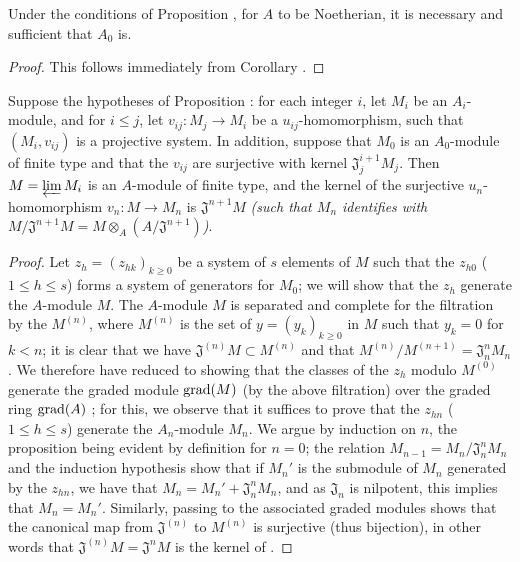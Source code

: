 \begin{corollary}[7.2.8]
\label{0.7.2.8}
Under the conditions of Proposition , for $A$ to
be Noetherian, it is necessary and sufficient that $A_0$ is.
\end{corollary}

\begin{proof}
This follows immediately from Corollary .
\end{proof}

\begin{proposition}[7.2.9]
\label{0.7.2.9}
Suppose the hypotheses of Proposition : for each integer $i$,
let $M_i$ be an $A_i$-module, and for $i\leq j$, let $v_{ij}:M_j\to M_i$ be a
$u_{ij}$-homomorphism, such that $(M_i,v_{ij})$ is a projective system. In addition, suppose
that $M_0$ is an $A_0$-module of finite type and that the $v_{ij}$ are surjective with kernel
$\mathfrak{J}_j^{i+1}M_j$. Then $M=\varprojlim M_i$ is an $A$-module of finite type, and the
kernel of the surjective $u_n$-homomorphism $v_n:M\to M_n$ is $\mathfrak{J}^{n+1}M$
\emph{(such that $M_n$ identifies with
$M/\mathfrak{J}^{n+1}M=M\otimes_A(A/\mathfrak{J}^{n+1})$)}.
\end{proposition}

\begin{proof}
Let $z_h=(z_{hk})_{k\geq 0}$ be a system of $s$ elements of $M$ such that the $z_{h0}$
($1\leq h\leq s$) forms a system of generators for $M_0$; we will show that the
$z_h$ generate the $A$-module $M$. The $A$-module $M$ is separated and complete for the
filtration by the $M^{(n)}$, where $M^{(n)}$ is the set of $y=(y_k)_{k\geq 0}$ in $M$
such that $y_k=0$ for $k<n$; it is clear that we have $\mathfrak{J}^{(n)}M\subset M^{(n)}$
and that $M^{(n)}/M^{(n+1)}=\mathfrak{J}_n^n M_n$. We therefore have reduced to showing that
the classes of the $z_h$ modulo $M^{(0)}$ generate the graded module ${\mathop{\mathrm{grad}}\nolimits}(M)$ (by the
above filtration) over the graded ring ${\mathop{\mathrm{grad}}\nolimits}(A)$ \cite[p.~18--06, lemme]{I-1}; for this, we
observe that it suffices to prove that the $z_{hn}$ ($1\leq h\leq s$) generate the
$A_n$-module $M_n$. We argue by induction on $n$, the proposition being evident by definition
for $n=0$; the relation $M_{n-1}=M_n/\mathfrak{J}_n^n M_n$ and the induction hypothesis show
that if $M_n'$ is the submodule of $M_n$ generated by the $z_{hn}$, we have that
$M_n=M_n'+\mathfrak{J}_n^n M_n$, and as $\mathfrak{J}_n$ is nilpotent, this implies that
$M_n=M_n'$. Similarly, passing to the associated graded modules shows that the canonical map
from $\mathfrak{J}^{(n)}$ to $M^{(n)}$ is surjective (thus bijection), in other words that
$\mathfrak{J}^{(n)}M=\mathfrak{J}^n M$ is the kernel of .
\end{proof}

